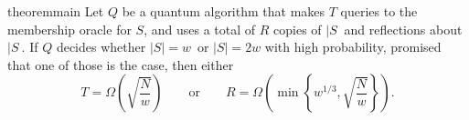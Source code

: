 \setcounter{theorem}{3}
\begin{restatable}{theorem}{main}
\label{thm:main}
Let $Q$ be a quantum algorithm that makes $T$ queries to the membership oracle for $S$,
and uses a total of $R$ copies of $|S\>$ and reflections about $|S\>$.
If $Q$ decides whether $\left\vert S\right\vert =w$\ or $\left\vert S\right\vert =2w$
with high probability, promised that one of those is the case, then either
\begin{equation}
T=\Omega\left(  \sqrt{\frac{N}{w}}\right)  \qquad \textrm{or} \qquad
R=\Omega\left(  \min\left\{  w^{1/3},\sqrt{\frac{N}{w}}\right\}  \right).
\end{equation}
\end{restatable}
